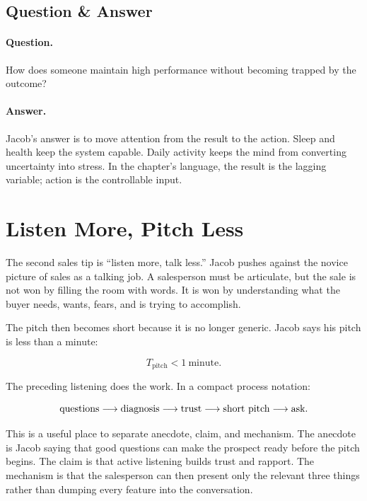 \subsection{Question \& Answer}

\paragraph{Question.}
How does someone maintain high performance without becoming trapped by the outcome?

\paragraph{Answer.}
Jacob's answer is to move attention from the result to the action. Sleep and health keep the system capable. Daily activity keeps the mind from converting uncertainty into stress. In the chapter's language, the result is the lagging variable; action is the controllable input.

\section{Listen More, Pitch Less}

The second sales tip is ``listen more, talk less.'' Jacob pushes against the novice picture of sales as a talking job. A salesperson must be articulate, but the sale is not won by filling the room with words. It is won by understanding what the buyer needs, wants, fears, and is trying to accomplish.

The pitch then becomes short because it is no longer generic. Jacob says his pitch is less than a minute:

\begin{equation}
T_{\mathrm{pitch}} < 1\ \mathrm{minute}.
\end{equation}

The preceding listening does the work. In a compact process notation:

\begin{equation}
\hbox{questions}
\longrightarrow
\hbox{diagnosis}
\longrightarrow
\hbox{trust}
\longrightarrow
\hbox{short pitch}
\longrightarrow
\hbox{ask}.
\end{equation}

This is a useful place to separate anecdote, claim, and mechanism. The anecdote is Jacob saying that good questions can make the prospect ready before the pitch begins. The claim is that active listening builds trust and rapport. The mechanism is that the salesperson can then present only the relevant three things rather than dumping every feature into the conversation.

